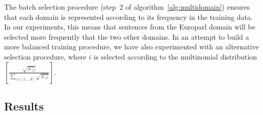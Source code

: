 \documentclass[11pt,a4paper]{article}
\newcommand{\fyTodo}[1]{\Todo[FY:]{\textcolor{orange}{#1}}}
\begin{document}
The batch selection procedure (step~2 of algorithm~\ref{alg:multidomain}) ensures that each domain is represented according to its frequency in the training data. In our experiments, this means that sentences from the Europarl domain will be selected more frequently that the two other domains. In an attempt to build a more balanced training procedure, we have also experimented with an alternative selection procedure, where $i$ is selected according to the multinomial distribution $[\frac{\sqrt{|C_i|}}{\displaystyle{\mathop{\sum}_{i\in [1,..,d]}\sqrt{|C_i|}}}]$.
\fyTodo{Refs on this ? or contrast ?}

\subsection{Results \label{ssec:results}}

\end{document}
